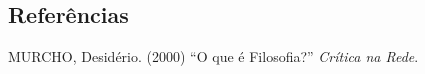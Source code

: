 \documentclass[
	article,			%
	12pt,				%
	twoside,			%
	a4paper,			%
	english,			%
	brazil,				%
	sumario=tradicional
]{plano}
\begin{document}
\fi


\begin{snugshade}
	\section{Referências} %
\end{snugshade}


	 MURCHO, Desidério. (2000) ``O que é Filosofia?'' \textit{Crítica na Rede}.
















\end{document}
